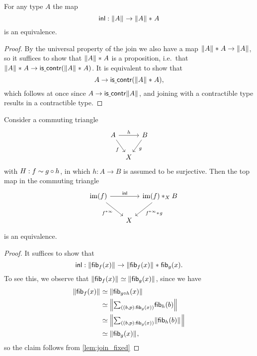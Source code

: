 \begin{lem}\label{lem:join_fixed}
For any type $A$ the map
\begin{equation*}
{\mathsf{inl}} : \Vert A\Vert_{}\to {\Vert A\Vert_{}}\ast_{}{A}
\end{equation*}
is an equivalence.
\end{lem}

\begin{proof}
By the universal property of the join we also have a map ${\Vert A\Vert_{}}\ast_{}{A}\to \Vert A\Vert_{}$, so it suffices to show that ${\Vert A\Vert_{}}\ast_{}{A}$ is a proposition, i.e.~that ${\Vert A\Vert_{}}\ast_{}{A}\to\mathsf{is\underline{\ }{}contr}({\Vert A\Vert_{}}\ast_{}{A})$. It is equivalent to show that
\begin{equation*}
A\to\mathsf{is\underline{\ }{}contr}({\Vert A\Vert_{}}\ast_{}{A}),
\end{equation*}
which follows at once since $A\to\mathsf{is\underline{\ }{}contr} \Vert A\Vert_{}$, and joining with a contractible type results in a contractible type.
\end{proof}

\begin{cor}
Consider a commuting triangle
\begin{equation*}
\begin{tikzcd}[column sep=tiny]
A \arrow[rr,"h"] \arrow[dr,swap,"f"] & & B \arrow[dl,"g"] \\
& X
\end{tikzcd}
\end{equation*}
with $H:f\sim g\circ h$, in which $h:A\to B$ is assumed to be surjective. Then the top map in the commuting triangle
\begin{equation*}
\begin{tikzcd}[column sep=tiny]
\im(f) \arrow[rr,"\inl"] \arrow[dr,swap,"f^{\ast\infty}"] & & \join[X]{\im(f)}{B} \arrow[dl,"\join{f^{\ast\infty}}{g}"] \\
\phantom{\join[X]{\im(f)}{B}} & X
\end{tikzcd}
\end{equation*}
is an equivalence.
\end{cor}

\begin{proof}
It suffices to show that
\begin{equation*}
{\mathsf{inl}}:\Vert \mathsf{fib}_{f}(x)\Vert_{}\to {\Vert \mathsf{fib}_{f}(x)\Vert_{}}\ast_{}{\mathsf{fib}_{g}(x)}.
\end{equation*}
To see this, we observe that $\Vert \mathsf{fib}_{f}(x)\Vert_{}\simeq \Vert \mathsf{fib}_{g}(x)\Vert_{}$, since we have
\begin{align*}
\brck{\fib{f}{x}} & \eqvsym \brck{\fib{g\circ h}{x}}\phantom{\Brck{~}} \\
& \eqvsym \Brck{\sm{(b,p):\fib{g}{x}}\fib{h}{b}} \\
& \eqvsym \Brck{\sm{(b,p):\fib{g}{x}}\brck{\fib{h}{b}}} \\
& \eqvsym \brck{\fib{g}{x}},\phantom{\Brck{~}}
\end{align*}
so the claim follows from \cref{lem:join_fixed}
\end{proof}

